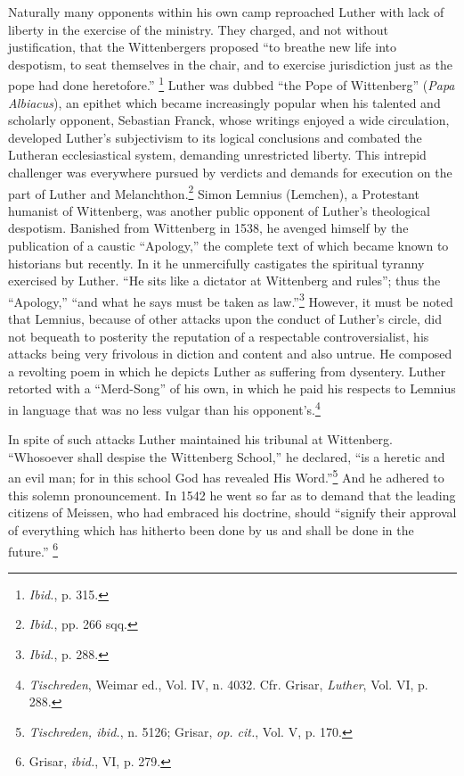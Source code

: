 Naturally many opponents within his own camp reproached Luther
with lack of liberty in the exercise of the ministry. They charged,
and not without justification, that the Wittenbergers proposed “to
breathe new life into despotism, to seat themselves in the chair, and
to exercise jurisdiction just as the pope had done heretofore.”
\footnote{\textit{Ibid.}, p. 315.}
Luther was dubbed “the Pope of Wittenberg” (\textit{Papa Albiacus}), an
epithet which became increasingly popular when his talented and
scholarly opponent, Sebastian Franck, whose writings enjoyed a wide
circulation, developed Luther’s subjectivism to its logical conclusions
and combated the Lutheran ecclesiastical system, demanding unrestricted
liberty. This intrepid challenger was everywhere pursued by
verdicts and demands for execution on the part of Luther and
Melanchthon.\footnote{\textit{Ibid.}, pp. 266 sqq.}
Simon Lemnius (Lemchen), a Protestant humanist of
Wittenberg, was another public opponent of Luther’s theological
despotism. Banished from Wittenberg in 1538, he avenged himself by
the publication of a caustic “Apology,” the complete text of which
became known to historians but recently. In it he unmercifully
castigates the spiritual tyranny exercised by Luther. “He sits like a
dictator at Wittenberg and rules”; thus the “Apology,” “and what
he says must be taken as law.”\footnote{\textit{Ibid.}, p. 288.}
However, it must be noted that
Lemnius, because of other attacks upon the conduct of Luther’s circle,
did not bequeath to posterity the reputation of a respectable
controversialist, his attacks being very frivolous
in diction and content and also untrue. He composed a revolting poem in which he
depicts Luther as suffering from dysentery. Luther retorted with a
“Merd-Song” of his own, in which he paid his respects to Lemnius in
language that was no less vulgar than his opponent’s.\footnote
{\textit{Tischreden}, Weimar ed., Vol. IV, n. 4032. Cfr. Grisar, \textit{Luther}, Vol. VI, p. 288.}

In spite of such attacks Luther maintained his tribunal at Wittenberg.
“Whosoever shall despise the Wittenberg School,” he declared,
“is a heretic and an evil man; for in this school God has revealed His
Word.”\footnote{\textit{Tischreden, ibid.}, n. 5126; Grisar, \textit{op. cit.}, Vol. V, p. 170.}
And he adhered to this solemn pronouncement. In 1542 he
went so far as to demand that the leading citizens of Meissen, who
had embraced his doctrine, should “signify their approval of everything
which has hitherto been done by us and shall be done in the
future.”
\footnote{Grisar, \textit{ibid.}, VI, p. 279.}


